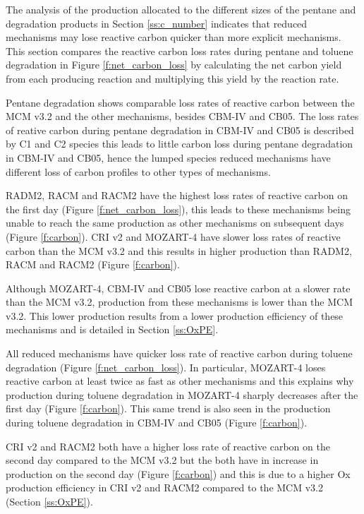 The analysis of the  production allocated to the different sizes of the pentane and degradation products in Section \ref{ss:c_number} indicates that reduced mechanisms may lose reactive carbon quicker than more explicit mechanisms.
This section compares the reactive carbon loss rates during pentane and toluene degradation in Figure \ref{f:net_carbon_loss} by calculating the net carbon yield from each  producing reaction and multiplying this yield by the reaction rate.

Pentane degradation shows comparable loss rates of reactive carbon between the MCM v3.2 and the other mechanisms, besides CBM-IV and CB05.
The loss rates of reative carbon during pentane degradation in CBM-IV and CB05 is described by C1 and C2 species this leads to little carbon loss during pentane degradation in CBM-IV and CB05, hence the lumped species reduced mechanisms have different loss of carbon profiles to other types of mechanisms.

RADM2, RACM and RACM2 have the highest loss rates of reactive carbon on the first day (Figure \ref{f:net_carbon_loss}), this leads to these mechanisms being unable to reach the same  production as other mechanisms on subsequent days (Figure \ref{f:carbon}).
CRI v2 and MOZART-4 have slower loss rates of reactive carbon than the MCM v3.2 and this results in higher  production than RADM2, RACM and RACM2 (Figure \ref{f:carbon}).

Although MOZART-4, CBM-IV and CB05 lose reactive carbon at a slower rate than the MCM v3.2,  production from these mechanisms is lower than the MCM v3.2.
This lower  production results from a lower  production efficiency of these mechanisms and is detailed in Section \ref{ss:OxPE}.

All reduced mechanisms have quicker loss rate of reactive carbon during toluene degradation (Figure \ref{f:net_carbon_loss}).
In particular, MOZART-4 loses reactive carbon at least twice as fast as other mechanisms and this explains why  production during toluene degradation in MOZART-4 sharply decreases after the first day (Figure \ref{f:carbon}).
This same trend is also seen in the  production during toluene degradation in CBM-IV and CB05 (Figure \ref{f:carbon}).

CRI v2 and RACM2 both have a higher loss rate of reactive carbon on the second day compared to the MCM v3.2 but the both have in increase in  production on the second day (Figure \ref{f:carbon}) and this is due to a higher Ox production efficiency in CRI v2 and RACM2 compared to the MCM v3.2 (Section \ref{ss:OxPE}).

